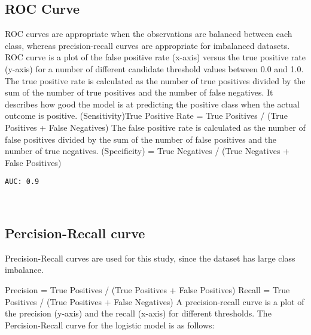 \documentclass[11pt]{article}
\begin{document}
    \hypertarget{roc-curve}{%
\subsection{ROC Curve}\label{roc-curve}}

    ROC curves are appropriate when the observations are balanced between
each class, whereas precision-recall curves are appropriate for
imbalanced datasets. ROC curve is a plot of the false positive rate
(x-axis) versus the true positive rate (y-axis) for a number of
different candidate threshold values between 0.0 and 1.0. The true
positive rate is calculated as the number of true positives divided by
the sum of the number of true positives and the number of false
negatives. It describes how good the model is at predicting the positive
class when the actual outcome is positive. (Sensitivity)True Positive
Rate = True Positives / (True Positives + False Negatives) The false
positive rate is calculated as the number of false positives divided by
the sum of the number of false positives and the number of true
negatives. (Specificity) = True Negatives / (True Negatives + False
Positives)

    \begin{Verbatim}[commandchars=\\\{\}]
AUC: 0.9

    \end{Verbatim}

    \begin{center}
    \end{center}
    { \hspace*{\fill} \\}
    
    \hypertarget{percision-recall-curve}{%
\subsection{Percision-Recall curve}\label{percision-recall-curve}}

    Precision-Recall curves are used for this study, since the dataset has
large class imbalance.

Precision = True Positives / (True Positives + False Positives) Recall =
True Positives / (True Positives + False Negatives) A precision-recall
curve is a plot of the precision (y-axis) and the recall (x-axis) for
different thresholds. The Percision-Recall curve for the logistic model
is as follows:
\end{document}
